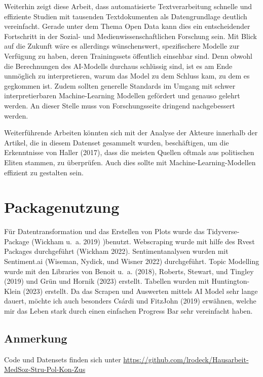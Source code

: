 \documentclass[
  11pt,
]{article}
\begin{document}
Weiterhin zeigt diese Arbeit, dass automatisierte Textverarbeitung
schnelle und effiziente Studien mit tausenden Textdokumenten als
Datengrundlage deutlich vereinfacht. Gerade unter dem Thema Open Data
kann dies ein entscheidender Fortschritt in der Sozial- und
Medienwissenschaftlichen Forschung sein. Mit Blick auf die Zukunft wäre
es allerdings wünschenswert, spezifischere Modelle zur Verfügung zu
haben, deren Trainingssets öffentlich einsehbar sind. Denn obwohl die
Berechnungen des AI-Modells durchaus schlüssig sind, ist es am Ende
unmöglich zu interpretieren, warum das Model zu dem Schluss kam, zu dem
es gegkommen ist. Zudem sollten generelle Standards im Umgang mit schwer
interpretierbaren Machine-Learning Modellen gefördert und genauso
gelehrt werden. An dieser Stelle muss von Forschungsseite dringend
nachgebessert werden.

Weiterführende Arbeiten könnten sich mit der Analyse der Akteure
innerhalb der Artikel, die in diesem Datenset gesammelt wurden,
beschäftigen, um die Erkenntnisse von Haller (2017), dass die meisten
Quellen oftmals aus politischen Eliten stammen, zu überprüfen. Auch dies
sollte mit Machine-Learning-Modellen effizient zu gestalten sein.

\hypertarget{packagenutzung}{%
\section*{Packagenutzung}\label{packagenutzung}}

Für Datentransformation und das Erstellen von Plots wurde das
Tidyverse-Package (Wickham u.~a. 2019) )benutzt. Webscraping wurde mit
hilfe des Rvest Packages durchgeführt (Wickham 2022). Sentimentanalysen
wurden mit Sentiment.ai (Wiseman, Nydick, und Wisner 2022) durchgeführt.
Topic Modelling wurde mit den Libraries von Benoit u.~a. (2018),
Roberts, Stewart, und Tingley (2019) und Grün und Hornik (2023)
erstellt. Tabellen wurden mit Huntington-Klein (2023) erstellt. Da das
Scrapen und Auswerten mittels AI Model sehr lange dauert, möchte ich
auch besonders Csárdi und FitzJohn (2019) erwähnen, welche mir das Leben
stark durch einen einfachen Progress Bar sehr vereinfacht haben.

\hypertarget{anmerkung}{%
\subsection*{Anmerkung}\label{anmerkung}}

Code und Datensets finden sich unter
\url{https://github.com/lrodeck/Hausarbeit-MedSoz-Stru-Pol-Kon-Zus}
\end{document}
